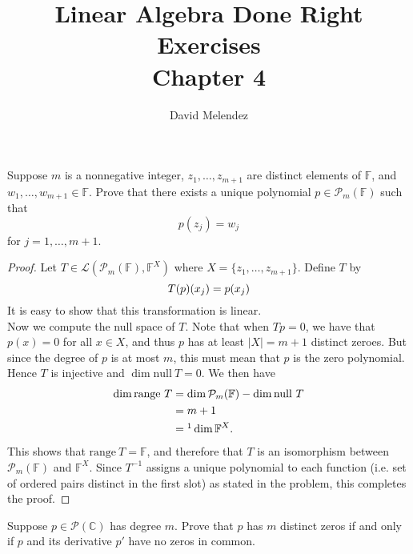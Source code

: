 \documentclass[12pt]{article}
\newenvironment{problem}[2][Problem]{\begin{trivlist}
\item[\hskip \labelsep {\bfseries #1}\hskip \labelsep {\bfseries #2.}]}{\end{trivlist}}
\newcommand{\nul}{\text{null}\ }
\newcommand{\range}{\text{range}\ }
\begin{document}
\title{Linear Algebra Done Right Exercises\\ \large Chapter 4}
\author{David Melendez}
\maketitle

\begin{problem}{5}
  Suppose $m$ is a nonnegative integer, $z_1,\dots,z_{m+1}$ are distinct elements of $\mathbb{F}$, and
  $w_1,\dots,w_{m+1} \in \mathbb{F}$. Prove that there exists a unique polynomial 
  $p\in \mathcal{P}_m(\mathbb{F})$ such that
  \begin{equation*}
    p(z_j) = w_j
  \end{equation*}
  for $j = 1,\dots,m+1$.
\end{problem}
\begin{proof}
  Let $T \in \mathcal{L}(\mathcal{P}_m(\mathbb{F}), \mathbb{F}^X)$ where $X = \{z_1,\dots,z_{m+1}\}$. 
  Define $T$ by
  \begin{equation*}
    T(p)(x_j) = p(x_j)\\
  \end{equation*}
  It is easy to show that this transformation is linear.\\
  Now we compute the null space of $T$.
  Note that when $Tp=0$, we have that $p(x)=0$ for all $x\in X$, 
  and thus $p$ has at least $|X| = m+1$ distinct zeroes. 
  But since the degree of $p$ is at most $m$, this must mean that $p$ is the zero polynomial.
  Hence $T$ is injective and $\dim\nul T = 0$. 
  We then have
  \begin{align*}
    \dim\range T &= \dim \mathcal{P}_m(\mathbb{F}) - \dim\nul T\\
    &= m + 1 \\
    &=\footnotemark \dim \mathbb{F}^X\text{.}
  \end{align*}
  This shows that $\range T = \mathbb{F}$, and therefore that $T$ is an isomorphism between
  $\mathcal{P}_m(\mathbb{F})$ and $\mathbb{F}^X$. 
  Since $T^{-1}$ assigns a unique polynomial to each function 
  (i.e. set of ordered pairs distinct in the first slot) 
  as stated in the problem, this completes the proof.
\end{proof}
\begin{problem}{6}
  Suppose $p\in\mathcal{P}(\mathbb{C})$ has degree $m$. 
  Prove that $p$ has $m$ distinct zeros if and only if $p$ and its derivative $p'$ have no zeros in common.
\end{problem}
\end{document}
